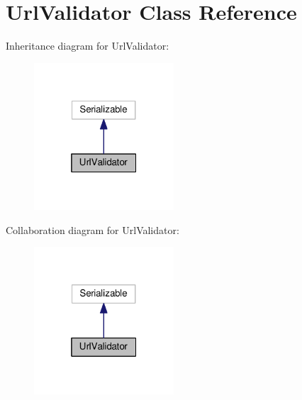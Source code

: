 \hypertarget{classUrlValidator}{}\section{Url\+Validator Class Reference}
\label{classUrlValidator}


Inheritance diagram for Url\+Validator\+:
\nopagebreak
\begin{figure}[H]
\begin{center}
\leavevmode
\includegraphics[width=148pt]{classUrlValidator__inherit__graph}
\end{center}
\end{figure}


Collaboration diagram for Url\+Validator\+:
\nopagebreak
\begin{figure}[H]
\begin{center}
\leavevmode
\includegraphics[width=148pt]{classUrlValidator__coll__graph}
\end{center}
\end{figure}
